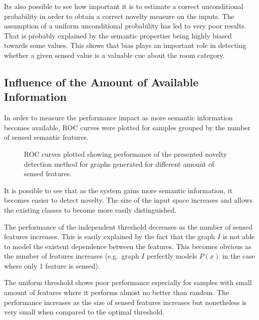 Its also possible to see how important it is to estimate a correct unconditional
probability in order to obtain a correct novelty measure on the inputs.
The assumption of a uniform unconditional probability has led to very poor results.
That is probably explained by the semantic properties being highly
biased towards some values. This shows that bias plays an important role
in detecting whether a given sensed value is a valuable cue about the room category.



\subsection{Influence of the Amount of Available Information}
In order to measure the performance impact as more semantic information becomes
available, ROC curves were plotted for samples grouped by the number of sensed
semantic features.

\begin{figure}[h]
\centering

\qquad
{}

\qquad
{}

\caption{\label{fig:synthetic-roc-breakdown}ROC curves plotted showing performance of the
         presented novelty detection method for graphs generated for different amount of
         sensed features.}
\end{figure}

It is possible to see that as the system gains more semantic information, it
becomes easier to detect novelty. The size of the input space increases and allows the
existing classes to become more easily distinguished.

The performance of the independent threshold decreases as the number of sensed
features increases. This is easily explained by the fact that the graph $I$ is not
able to model the existent dependence between the features. This becomes obvious
as the number of features increases (e.g.\ graph $I$ perfectly models $P(x)$ in the
case where only 1 feature is sensed).

The uniform threshold shows poor performance especially for samples with small amount of features
where it performs almost no better than random.
The performance increases as the size of sensed features increases but nonetheless
is very small when compared to the optimal threshold.

